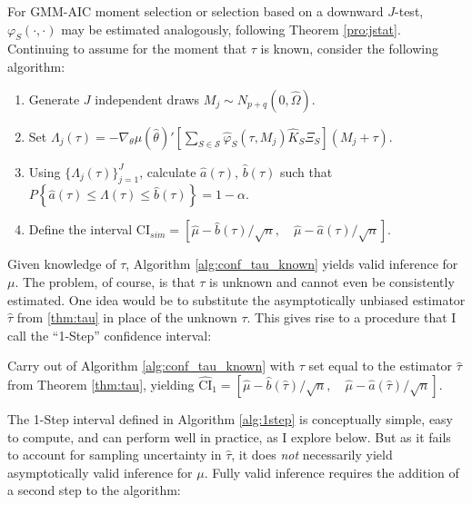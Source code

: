 For GMM-AIC moment selection or selection based on a downward $J$-test, $\varphi_S(\cdot,\cdot)$ may be estimated analogously, following  Theorem \ref{pro:jstat}. 
Continuing to assume for the moment that $\tau$ is known, consider the following algorithm:
\begin{alg}
\mbox{}
		\begin{enumerate}
\label{alg:conf_tau_known}
			\item Generate $J$ independent draws $M_j \sim N_{p+q}(0, \widehat{\Omega})$.
			\item Set $\Lambda_j(\tau) = -\nabla_\theta\mu(\widehat{\theta})'\left[\sum_{S \in \mathscr{S}} \widehat{\varphi}_S(\tau,M_j) \widehat{K}_S\Xi_S\right] (M_j + \tau)$.
			\item Using $\{\Lambda_j(\tau)\}_{j=1}^J$, calculate $\widehat{a}(\tau)$, $\widehat{b}(\tau)$ such that
		$P\left\{ \widehat{a}(\tau) \leq\Lambda(\tau)\leq \widehat{b}(\tau) \right\} = 1 - \alpha$.
  \item Define the interval 
    $ \mbox{CI}_{sim}=\left[ \widehat{\mu} - \widehat{b}(\tau)/\sqrt{n}, \quad \widehat{\mu} - \widehat{a}(\tau)/\sqrt{n} \right]$.
		\end{enumerate}
\end{alg}

Given knowledge of $\tau$, Algorithm \ref{alg:conf_tau_known} yields valid inference for $\mu$.
The problem, of course, is that $\tau$ is unknown and cannot even be consistently estimated.
One idea would be to substitute the asymptotically unbiased estimator $\widehat{\tau}$ from \ref{thm:tau} in place of the unknown $\tau$.
This gives rise to a procedure that I call the ``1-Step'' confidence interval:

\begin{alg}[1-Step CI] 
  \label{alg:1step}
Carry out of Algorithm \ref{alg:conf_tau_known} with $\tau$ set equal to the estimator $\widehat{\tau}$ from Theorem \ref{thm:tau}, yielding 
$ \widehat{\mbox{CI}}_{1}=\left[ \widehat{\mu} - \widehat{b}(\widehat{\tau})/\sqrt{n}, \quad \widehat{\mu} - \widehat{a}(\widehat{\tau})/\sqrt{n} \right]$.
\end{alg}

The 1-Step interval defined in Algorithm \ref{alg:1step} is conceptually simple, easy to compute, and can perform well in practice, as I explore below.
But as it fails to account for sampling uncertainty in $\widehat{\tau}$,  it does \emph{not} necessarily yield asymptotically valid inference for $\mu$.
Fully valid inference requires the addition of a second step to the algorithm:

